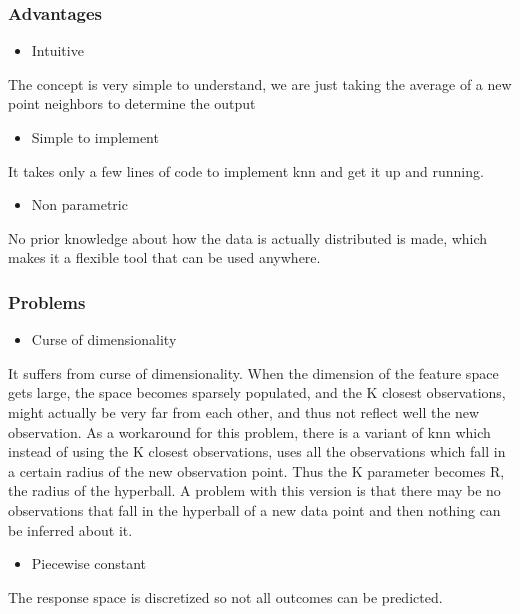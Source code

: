 \subsubsection{Advantages}
\begin{itemize}
\item Intuitive
\end{itemize}
The concept is very simple to understand, we are just taking the average of a new point neighbors to determine the output
\begin{itemize}
\item Simple to implement
\end{itemize}
It takes only a few lines of code to implement \acrshort{knn} and get it up and running.
\begin{itemize}
\item Non parametric
\end{itemize}
No prior knowledge about how the data is actually distributed is made, which makes it a flexible tool that can be used anywhere.

\subsubsection{Problems}
\begin{itemize}
\item Curse of dimensionality 
\end{itemize}
It suffers from curse of dimensionality. When the dimension of the feature space gets large, the space becomes sparsely populated, and the K closest observations, might actually be very far from each other, and thus not reflect well the new observation.
As a workaround for this problem, there is a variant of \acrshort{knn} which instead of using the K closest observations, uses all the observations which fall in a certain radius of the new observation point. Thus the K parameter becomes R, the radius of the hyperball. A problem with this version is that there may be no observations that fall in the hyperball of a new data point and then nothing can be inferred about it.
\begin{itemize}
\item Piecewise constant
\end{itemize}
The response space is discretized so not all outcomes can be predicted.

